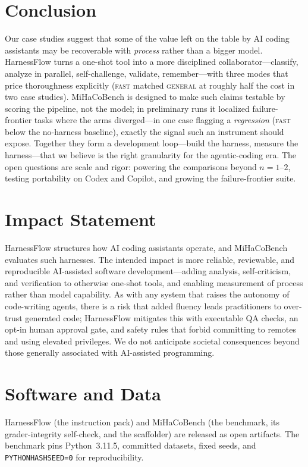 \documentclass{article}
\begin{document}
\section{Conclusion}

Our case studies suggest that some of the value left on the table by AI coding
assistants may be recoverable with \emph{process} rather than a bigger model.
HarnessFlow turns a one-shot tool into a more disciplined collaborator---classify,
analyze in parallel, self-challenge, validate, remember---with three modes that
price thoroughness explicitly (\textsc{fast} matched \textsc{general} at roughly
half the cost in two case studies). MiHaCoBench is designed to make such claims
testable by scoring the pipeline, not the model; in preliminary runs it localized
failure-frontier tasks where the arms diverged---in one case flagging a
\emph{regression} (\textsc{fast} below the no-harness baseline), exactly the
signal such an instrument should expose. Together they form a development
loop---build the harness, measure the harness---that we believe is the right
granularity for the agentic-coding era. The open questions are scale and rigor:
powering the comparisons beyond $n{=}1$--$2$, testing portability on Codex and
Copilot, and growing the failure-frontier suite.

\section*{Impact Statement}

HarnessFlow structures how AI coding assistants operate, and MiHaCoBench evaluates
such harnesses. The intended impact is more reliable, reviewable, and reproducible
AI-assisted software development---adding analysis, self-criticism, and
verification to otherwise one-shot tools, and enabling measurement of process
rather than model capability. As with any system that raises the autonomy of
code-writing agents, there is a risk that added fluency leads practitioners to
over-trust generated code; HarnessFlow mitigates this with executable QA checks, an
opt-in human approval gate, and safety rules that forbid committing to remotes and
using elevated privileges. We do not anticipate societal consequences beyond those
generally associated with AI-assisted programming.

\section*{Software and Data}

HarnessFlow (the instruction pack) and MiHaCoBench (the benchmark, its
grader-integrity self-check, and the scaffolder) are released as open artifacts.
The benchmark pins Python~3.11.5, committed datasets, fixed seeds, and
\texttt{PYTHONHASHSEED=0} for reproducibility.



\end{document}
